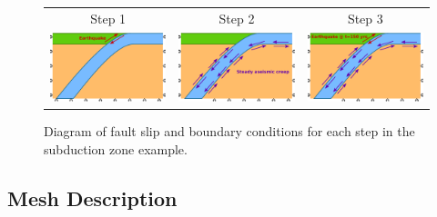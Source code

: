 \begin{figure}
  \begin{tabular}{ccc}
    Step 1 & Step 2 & Step 3 \\
    \includegraphics[width=2in]{examples/figs/subduction2d_step01} &
    \includegraphics[width=2in]{examples/figs/subduction2d_step02} & 
    \includegraphics[width=2in]{examples/figs/subduction2d_step03} \\
  \end{tabular}
  \caption{Diagram of fault slip and boundary conditions for each step in the
    subduction zone example.}
  \label{fig:example:subduction:2d:steps}
\end{figure}


\subsection{Mesh Description}

